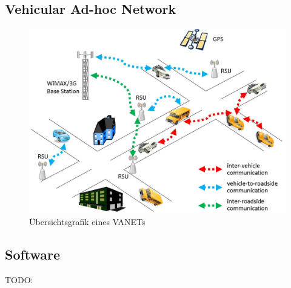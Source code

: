 \subsection{Vehicular Ad-hoc Network}

\begin{figure}[H]
    \centering
    \includegraphics[width=.485\textwidth]{resources/images/vanet.jpg}
    \caption{Übersichtsgrafik eines VANETs \cite{vanet}}
\end{figure}

\subsection{Software}
TODO: